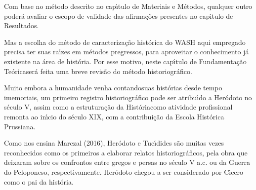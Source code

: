 \documentclass[
12pt,		%
openright,	%
twoside,  %
a4paper,			%
chapter=TITLE,		%
english,			%
french,				%
spanish,			%
brazil				%
]{USPSC-classe/USPSC}
\begin{document}
Com base no m\'etodo descrito no cap\'{\i}tulo de \textquotedbl Materiais e M\'etodos\textquotedbl , qualquer outro poder\'a avaliar o escopo de validade das afirma\c{c}\~oes presentes no cap\'{\i}tulo de \textquotedbl Resultados\textquotedbl .














Mas a escolha do m\'etodo de caracteriza\c{c}\~ao hist\'orica do WASH aqui empregado precisa ter suas ra\'{\i}zes em m\'etodos pregressos, para aproveitar o conhecimento j\'a existente na \'area de hist\'oria. Por esse motivo, neste cap\'{\i}tulo de \textquotedbl Fundamenta\c{c}\~ao Te\'orica\textquotedbl  ser\'a feita uma breve revis\~ao do m\'etodo historiogr\'afico.














Muito embora a humanidade venha \textquotedbl contando\textquotedbl  suas hist\'orias desde tempo imemoriais, um primeiro registro historiogr\'afico pode ser atribu\'{\i}do a Her\'odoto no s\'eculo V, assim como a estrutura\c{c}\~ao da \textquotedbl Hist\'oria\textquotedbl  como atividade profissional remonta ao in\'{\i}cio do s\'eculo XIX, com a contribui\c{c}\~ao da Escola Hist\'orica Prussiana.














Como nos ensina  Marczal (2016),  Her\'odoto e Tuc\'{\i}dides s\~ao muitas vezes reconhecidos como os primeiros a elaborar relatos historiogr\'aficos, pela obra que deixaram sobre os confrontos entre gregos e persas no s\'eculo V a.c. ou da Guerra do Peloponeso, respectivamente. Her\'odoto chegou a ser considerado por C\'{\i}cero como o \textquotedbl pai da hist\'oria\textquotedbl  [XXX].
\end{document}
